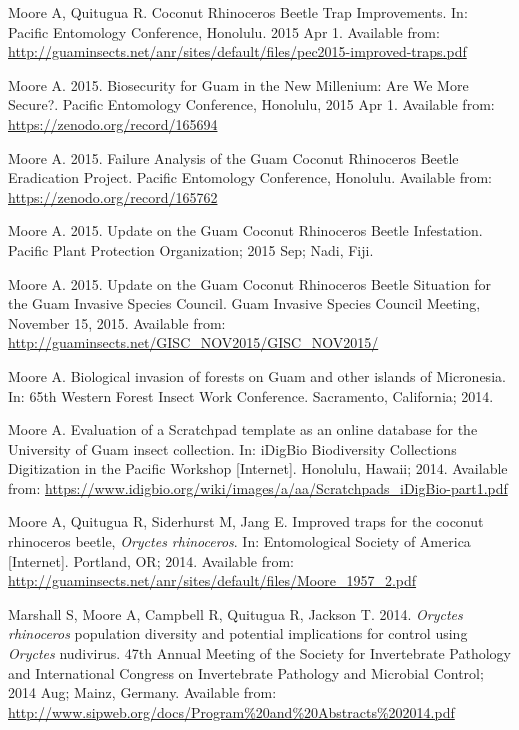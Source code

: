 \documentclass[12pt,english]{simplecv}
\begin{document}
\begin{thebibliography}{999}
\bibitem{}Moore A, Quitugua R. Coconut Rhinoceros Beetle Trap Improvements. In: Pacific Entomology Conference, Honolulu. 2015 Apr 1. Available from: \url{http://guaminsects.net/anr/sites/default/files/pec2015-improved-traps.pdf}

\bibitem{}Moore A. 2015. Biosecurity for Guam in the New Millenium: Are We More Secure?. Pacific Entomology Conference, Honolulu, 2015 Apr 1. Available from: \url{https://zenodo.org/record/165694}

\bibitem{}Moore A. 2015. Failure Analysis of the Guam Coconut Rhinoceros Beetle Eradication Project. Pacific Entomology Conference, Honolulu. Available from: \url{https://zenodo.org/record/165762}

\bibitem{}Moore A. 2015. Update on the Guam Coconut Rhinoceros Beetle Infestation. Pacific Plant Protection Organization; 2015 Sep; Nadi, Fiji. 

\bibitem{}Moore A. 2015. Update on the Guam Coconut Rhinoceros Beetle Situation for the Guam Invasive Species Council. Guam Invasive Species Council Meeting, November 15, 2015. Available from: \url{http://guaminsects.net/GISC\_NOV2015/GISC\_NOV2015/}


\bibitem{}Moore A. Biological invasion of forests on Guam and other islands of Micronesia. In: 65th Western Forest Insect Work Conference. Sacramento, California; 2014. 

\bibitem{}Moore A. Evaluation of a Scratchpad template as an online database for the University of Guam insect collection. In: iDigBio Biodiversity Collections Digitization in the Pacific Workshop [Internet]. Honolulu, Hawaii; 2014. Available from: \url{https://www.idigbio.org/wiki/images/a/aa/Scratchpads_iDigBio-part1.pdf}

\bibitem{}Moore A, Quitugua R, Siderhurst M, Jang E. Improved traps for the coconut rhinoceros beetle, \emph{Oryctes rhinoceros}. In: Entomological Society of America [Internet]. Portland, OR; 2014. Available from: \url{http://guaminsects.net/anr/sites/default/files/Moore_1957_2.pdf}
	
\bibitem{}Marshall S, Moore A, Campbell R, Quitugua R, Jackson T. 2014. \emph{Oryctes rhinoceros} population diversity and potential implications for control using \emph{Oryctes} nudivirus. 47th Annual Meeting of the Society for Invertebrate Pathology and International Congress on Invertebrate Pathology and Microbial Control; 2014 Aug; Mainz, Germany. Available from: \url{http://www.sipweb.org/docs/Program%20and%20Abstracts%202014.pdf}


\end{thebibliography}
\end{document}
